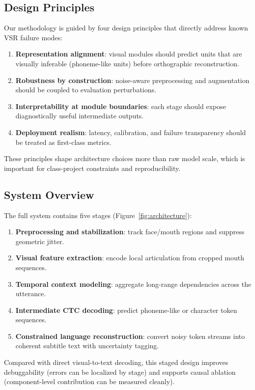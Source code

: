 \documentclass[10pt,twocolumn,letterpaper]{article}
\begin{document}
\subsection{Design Principles}
Our methodology is guided by four design principles that directly address known VSR failure modes:
\begin{enumerate}[leftmargin=*]
    \item \textbf{Representation alignment}: visual modules should predict units that are visually inferable (phoneme-like units) before orthographic reconstruction.
    \item \textbf{Robustness by construction}: noise-aware preprocessing and augmentation should be coupled to evaluation perturbations.
    \item \textbf{Interpretability at module boundaries}: each stage should expose diagnostically useful intermediate outputs.
    \item \textbf{Deployment realism}: latency, calibration, and failure transparency should be treated as first-class metrics.
\end{enumerate}
These principles shape architecture choices more than raw model scale, which is important for class-project constraints and reproducibility.

\subsection{System Overview}
The full system contains five stages (Figure~\ref{fig:architecture}):
\begin{enumerate}[leftmargin=*]
    \item \textbf{Preprocessing and stabilization}: track face/mouth regions and suppress geometric jitter.
    \item \textbf{Visual feature extraction}: encode local articulation from cropped mouth sequences.
    \item \textbf{Temporal context modeling}: aggregate long-range dependencies across the utterance.
    \item \textbf{Intermediate CTC decoding}: predict phoneme-like or character token sequences.
    \item \textbf{Constrained language reconstruction}: convert noisy token streams into coherent subtitle text with uncertainty tagging.
\end{enumerate}
Compared with direct visual-to-text decoding, this staged design improves debuggability (errors can be localized by stage) and supports causal ablation (component-level contribution can be measured cleanly).
\end{document}

